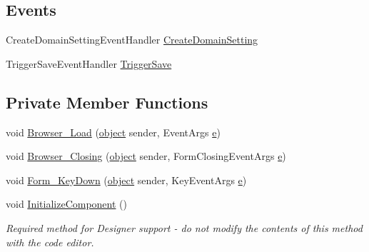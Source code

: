 \subsection*{Events}
\begin{DoxyCompactItemize}
\item 
Create\+Domain\+Setting\+Event\+Handler \hyperlink{class_web_analyzer_1_1_u_i_1_1_edit_domain_setting_form_a15f150af99974a02e7df872db755b121}{Create\+Domain\+Setting}
\item 
Trigger\+Save\+Event\+Handler \hyperlink{class_web_analyzer_1_1_u_i_1_1_edit_domain_setting_form_a1ddda08125c245cc97c50557b40f5fa2}{Trigger\+Save}
\end{DoxyCompactItemize}
\subsection*{Private Member Functions}
\begin{DoxyCompactItemize}
\item 
void \hyperlink{class_web_analyzer_1_1_u_i_1_1_edit_domain_setting_form_a9c305cf960d9600529ce6584bd87eff3}{Browser\+\_\+\+Load} (\hyperlink{_u_i_2_h_t_m_l_resources_2js_2lib_2underscore_8min_8js_aae18b7515bb2bc4137586506e7c0c903}{object} sender, Event\+Args \hyperlink{_u_i_2_h_t_m_l_resources_2js_2lib_2bootstrap_8min_8js_ab5902775854a8b8440bcd25e0fe1c120}{e})
\item 
void \hyperlink{class_web_analyzer_1_1_u_i_1_1_edit_domain_setting_form_a2dc3e8348dc7805997a56d1ec8d4548f}{Browser\+\_\+\+Closing} (\hyperlink{_u_i_2_h_t_m_l_resources_2js_2lib_2underscore_8min_8js_aae18b7515bb2bc4137586506e7c0c903}{object} sender, Form\+Closing\+Event\+Args \hyperlink{_u_i_2_h_t_m_l_resources_2js_2lib_2bootstrap_8min_8js_ab5902775854a8b8440bcd25e0fe1c120}{e})
\item 
void \hyperlink{class_web_analyzer_1_1_u_i_1_1_edit_domain_setting_form_aa4846285dc47768d6b45e4a84e3b671e}{Form\+\_\+\+Key\+Down} (\hyperlink{_u_i_2_h_t_m_l_resources_2js_2lib_2underscore_8min_8js_aae18b7515bb2bc4137586506e7c0c903}{object} sender, Key\+Event\+Args \hyperlink{_u_i_2_h_t_m_l_resources_2js_2lib_2bootstrap_8min_8js_ab5902775854a8b8440bcd25e0fe1c120}{e})
\item 
void \hyperlink{class_web_analyzer_1_1_u_i_1_1_edit_domain_setting_form_afa4d2cb7377e6e828d3317f85df2138a}{Initialize\+Component} ()
\begin{DoxyCompactList}\small\item\em Required method for Designer support -\/ do not modify the contents of this method with the code editor. \end{DoxyCompactList}\end{DoxyCompactItemize}
